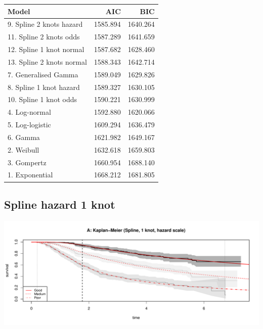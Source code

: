 \documentclass[]{article}
\begin{document}
\begin{table}[H]
\centering
\begin{tabular}{lrr}
\toprule
Model & AIC & BIC\\
\midrule
\rowcolor{gray!6}  9. Spline 2 knots hazard & 1585.894 & 1640.264\\
11. Spline 2 knots odds & 1587.289 & 1641.659\\
\rowcolor{gray!6}  12. Spline 1 knot normal & 1587.682 & 1628.460\\
13. Spline 2 knots normal & 1588.343 & 1642.714\\
\rowcolor{gray!6}  7. Generalised Gamma & 1589.049 & 1629.826\\
8. Spline 1 knot hazard & 1589.327 & 1630.105\\
\rowcolor{gray!6}  10. Spline 1 knot odds & 1590.221 & 1630.999\\
4. Log-normal & 1592.880 & 1620.066\\
\rowcolor{gray!6}  5. Log-logistic & 1609.294 & 1636.479\\
6. Gamma & 1621.982 & 1649.167\\
\rowcolor{gray!6}  2. Weibull & 1632.618 & 1659.803\\
3. Gompertz & 1660.954 & 1688.140\\
\rowcolor{gray!6}  1. Exponential & 1668.212 & 1681.805\\
\bottomrule
\end{tabular}
\end{table}

\subsection{Spline hazard 1 knot}\label{spline-hazard-1-knot}

\begin{flushleft}\includegraphics[height=0.3\textheight]{images/spline_hazard1-1} \end{flushleft}
\end{document}
